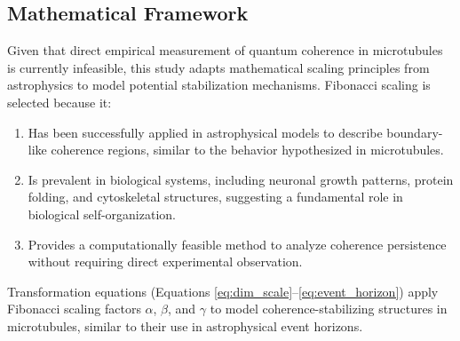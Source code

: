 \documentclass[entropy,article,submit,oneauthor,pdftex,]{Definitions/mdpi}
\begin{document}
\subsection{Mathematical Framework}
Given that direct empirical measurement of quantum coherence in microtubules is currently infeasible, this study adapts mathematical scaling principles from astrophysics to model potential stabilization mechanisms. Fibonacci scaling is selected because it:
\begin{enumerate}
    \item Has been successfully applied in astrophysical models to describe boundary-like coherence regions, similar to the behavior hypothesized in microtubules.
    \item Is prevalent in biological systems, including neuronal growth patterns, protein folding, and cytoskeletal structures, suggesting a fundamental role in biological self-organization.
    \item Provides a computationally feasible method to analyze coherence persistence without requiring direct experimental observation.
\end{enumerate}

Transformation equations (Equations \ref{eq:dim_scale}–\ref{eq:event_horizon}) apply Fibonacci scaling factors $\alpha$, $\beta$, and $\gamma$ to model coherence-stabilizing structures in microtubules, similar to their use in astrophysical event horizons.
\end{document}
